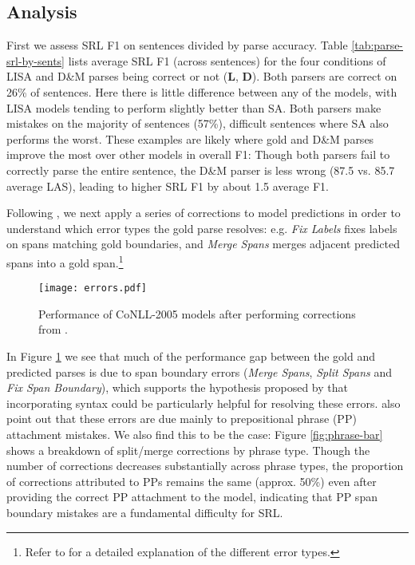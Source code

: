 \documentclass[11pt,a4paper]{article}
\begin{document}
\subsection{Analysis \label{sec:analysis}}



First we assess SRL F1 on sentences divided by parse accuracy. Table \ref{tab:parse-srl-by-sents} lists average SRL F1 (across sentences) for the four conditions of LISA and D\&M parses being correct or not ({\bf L}, {\bf D}). Both parsers are correct on 26\% of sentences. Here there is little difference between any of the models, with LISA models tending to perform slightly better than SA. Both parsers make mistakes on the majority of sentences (57\%), difficult sentences where SA also performs the worst. These examples are likely where gold and D\&M parses improve the most over other models in overall F1: Though both parsers fail to correctly parse the entire sentence, the D\&M parser is less wrong (87.5 vs. 85.7 average LAS), leading to higher SRL F1 by about 1.5 average F1.

Following \citet{he2017deep}, we next apply a series of corrections to model predictions in order to understand which error types the gold parse resolves: e.g. \emph{Fix Labels} fixes labels on spans matching gold boundaries, and \emph{Merge Spans} merges adjacent predicted spans into a gold span.\footnote{Refer to \citet{he2017deep} for a detailed explanation of the different error types.}

\begin{figure}
\texttt{[image: errors.pdf]}
\caption{Performance of CoNLL-2005 models after performing corrections from \citet{he2017deep}. \label{errors-fig}}
\end{figure}

In Figure \ref{errors-fig} we see that much of the performance gap between the gold and predicted parses is due to span boundary errors (\emph{Merge Spans}, \emph{Split Spans} and \emph{Fix Span Boundary}), which supports the hypothesis proposed by \citet{he2017deep} that incorporating syntax could be particularly helpful for resolving these errors. 
\citet{he2017deep} also point out that these errors are due mainly to prepositional phrase (PP) attachment mistakes. We also find this to be the case: Figure \ref{fig:phrase-bar} shows a breakdown of split/merge corrections by phrase type. Though the number of corrections decreases substantially across phrase types, the proportion of corrections attributed to PPs remains the same (approx. 50\%) even after providing the correct PP attachment to the model, indicating that PP span boundary mistakes are a fundamental difficulty for SRL.
\end{document}
